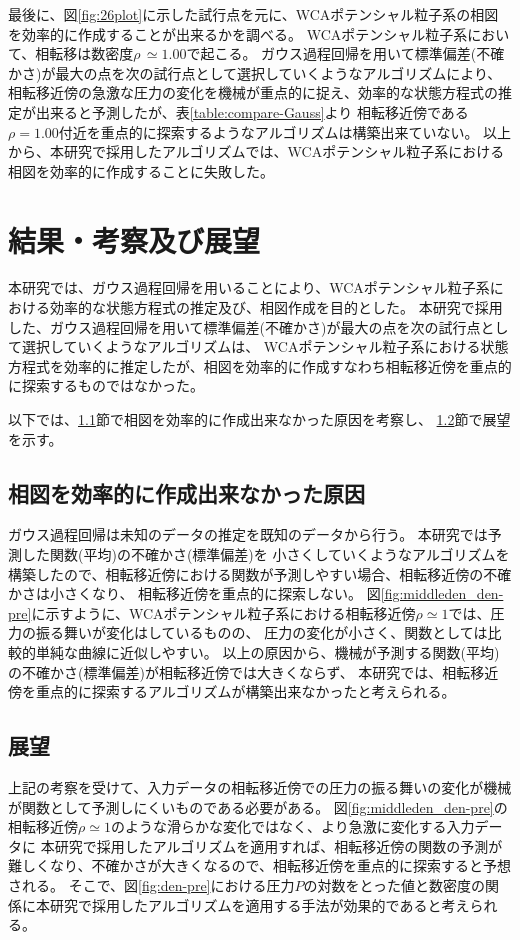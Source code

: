 \documentclass[titlepage]{jsreport}
\begin{document}
{{{最後に、図\ref{fig:26plot}に示した試行点を元に、WCAポテンシャル粒子系の相図を効率的に作成することが出来るかを調べる。
WCAポテンシャル粒子系において、相転移は数密度$\rho\,{\simeq}1.00$で起こる。
ガウス過程回帰を用いて標準偏差(不確かさ)が最大の点を次の試行点として選択していくようなアルゴリズムにより、
相転移近傍の急激な圧力の変化を機械が重点的に捉え、効率的な状態方程式の推定が出来ると予測したが、表\ref{table:compare-Gauss}より
相転移近傍である$\rho=1.00$付近を重点的に探索するようなアルゴリズムは構築出来ていない。
以上から、本研究で採用したアルゴリズムでは、WCAポテンシャル粒子系における相図を効率的に作成することに失敗した。




\chapter{結果・考察及び展望} \label{chap:summary}

本研究では、ガウス過程回帰を用いることにより、WCAポテンシャル粒子系における効率的な状態方程式の推定及び、相図作成を目的とした。
本研究で採用した、ガウス過程回帰を用いて標準偏差(不確かさ)が最大の点を次の試行点として選択していくようなアルゴリズムは、
WCAポテンシャル粒子系における状態方程式を効率的に推定したが、相図を効率的に作成すなわち相転移近傍を重点的に探索するものではなかった。

以下では、\ref{sum-sec:cause}節で相図を効率的に作成出来なかった原因を考察し、
\ref{sum-sec:outlook}節で展望を示す。



\section{相図を効率的に作成出来なかった原因}\label{sum-sec:cause}
ガウス過程回帰は未知のデータの推定を既知のデータから行う。
本研究では予測した関数(平均)の不確かさ(標準偏差)を
小さくしていくようなアルゴリズムを構築したので、相転移近傍における関数が予測しやすい場合、相転移近傍の不確かさは小さくなり、
相転移近傍を重点的に探索しない。
図\ref{fig:middleden_den-pre}に示すように、WCAポテンシャル粒子系における相転移近傍${\rho}\simeq{1}$では、圧力の振る舞いが変化はしているものの、
圧力の変化が小さく、関数としては比較的単純な曲線に近似しやすい。
以上の原因から、機械が予測する関数(平均)の不確かさ(標準偏差)が相転移近傍では大きくならず、
本研究では、相転移近傍を重点的に探索するアルゴリズムが構築出来なかったと考えられる。



\section{展望}\label{sum-sec:outlook}
上記の考察を受けて、入力データの相転移近傍での圧力の振る舞いの変化が機械が関数として予測しにくいものである必要がある。
図\ref{fig:middleden_den-pre}の相転移近傍${\rho}\simeq{1}$のような滑らかな変化ではなく、より急激に変化する入力データに
本研究で採用したアルゴリズムを適用すれば、相転移近傍の関数の予測が難しくなり、不確かさが大きくなるので、相転移近傍を重点的に探索すると予想される。
そこで、図\ref{fig:den-pre}における圧力$P$の対数をとった値と数密度の関係に本研究で採用したアルゴリズムを適用する手法が効果的であると考えられる。

}}}
\end{document}

